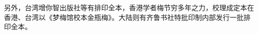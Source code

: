 \documentclass[letter,11pt,onecolumn,oneside]{book}
\begin{document}
另外，台湾增你智出版社等有排印全本，香港学者梅节穷多年之力，校理成定本在香港、台湾以《梦梅馆校本金瓶梅》。大陆则有齐鲁书社特批印制内部发行一批排印全本。















\backmatter

%

\end{document}
